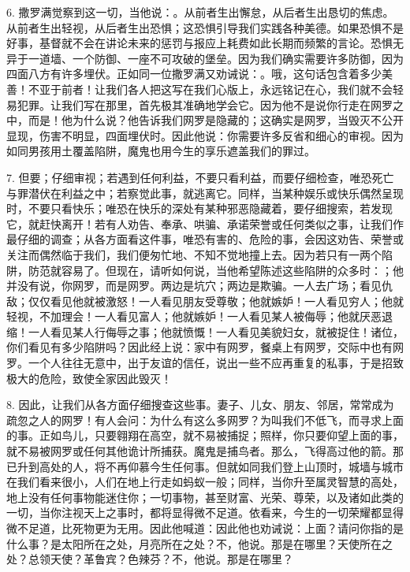 6. 撒罗满觉察到这一切，当他说：。从前者生出懈怠，从后者生出恳切的焦虑。从前者生出轻视，从后者生出恐惧；这恐惧引导我们实践各种美德。如果恐惧不是好事，基督就不会在讲论未来的惩罚与报应上耗费如此长期而频繁的言论。恐惧无异于一道墙、一个防御、一座不可攻破的堡垒。因为我们确实需要许多防御，因为四面八方有许多埋伏。正如同一位撒罗满又劝诫说：。哦，这句话包含着多少美善！不亚于前者！让我们各人把这写在我们心版上，永远铭记在心，我们就不会轻易犯罪。让我们写在那里，首先极其准确地学会它。因为他不是说你行走在网罗之中，而是！他为什么说？他告诉我们网罗是隐藏的；这确实是网罗，当毁灭不公开显现，伤害不明显，四面埋伏时。因此他说：你需要许多反省和细心的审视。因为如同男孩用土覆盖陷阱，魔鬼也用今生的享乐遮盖我们的罪过。\par

7. 但要；仔细审视；若遇到任何利益，不要只看利益，而要仔细检查，唯恐死亡与罪潜伏在利益之中；若察觉此事，就逃离它。同样，当某种娱乐或快乐偶然呈现时，不要只看快乐；唯恐在快乐的深处有某种邪恶隐藏着，要仔细搜索，若发现它，就赶快离开！若有人劝告、奉承、哄骗、承诺荣誉或任何类似之事，让我们作最仔细的调查；从各方面看这件事，唯恐有害的、危险的事，会因这劝告、荣誉或关注而偶然临于我们，我们便匆忙地、不知不觉地撞上去。因为若只有一两个陷阱，防范就容易了。但现在，请听如何说，当他希望陈述这些陷阱的众多时：；他并没有说，你网罗，而是网罗。两边是坑穴；两边是欺骗。一人去广场；看见仇敌；仅仅看见他就被激怒！一人看见朋友受尊敬；他就嫉妒！一人看见穷人；他就轻视，不加理会！一人看见富人；他就嫉妒！一人看见某人被侮辱；他就厌恶退缩！一人看见某人行侮辱之事；他就愤慨！一人看见美貌妇女，就被捉住！诸位，你们看见有多少陷阱吗？因此经上说：家中有网罗，餐桌上有网罗，交际中也有网罗。一个人往往无意中，出于友谊的信任，说出一些不应再重复的私事，于是招致极大的危险，致使全家因此毁灭！\par

8. 因此，让我们从各方面仔细搜查这些事。妻子、儿女、朋友、邻居，常常成为疏忽之人的网罗！有人会问：为什么有这么多网罗？为叫我们不低飞，而寻求上面的事。正如鸟儿，只要翱翔在高空，就不易被捕捉；照样，你只要仰望上面的事，就不易被网罗或任何其他诡计所捕获。魔鬼是捕鸟者。那么，飞得高过他的箭。那已升到高处的人，将不再仰慕今生任何事。但就如同我们登上山顶时，城墙与城市在我们看来很小，人们在地上行走如蚂蚁一般；同样，当你升至属灵智慧的高处，地上没有任何事物能迷住你；一切事物，甚至财富、光荣、尊荣，以及诸如此类的一切，当你注视天上之事时，都将显得微不足道。依看来，今生的一切荣耀都显得微不足道，比死物更为无用。因此他喊道：因此他也劝诫说：上面？请问你指的是什么事？是太阳所在之处，月亮所在之处？不，他说。那是在哪里？天使所在之处？总领天使？革鲁宾？色辣芬？不，他说。那是在哪里？\par


